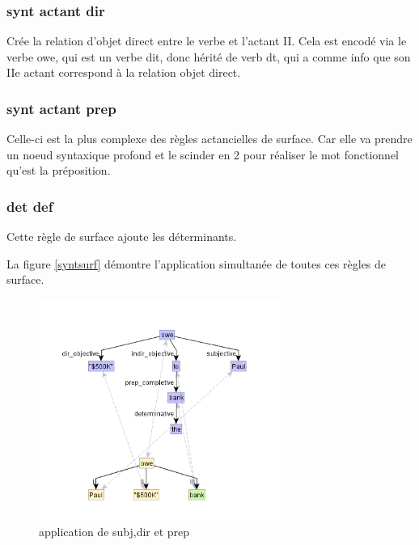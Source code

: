 
\subsubsection{synt actant dir}
Crée la relation d'objet direct entre le verbe et l'actant II. Cela est encodé via le verbe owe, qui est un verbe dit, donc hérité de verb dt, qui a comme info que son IIe actant correspond à la relation objet direct.

\subsubsection{synt actant prep}
Celle-ci est la plus complexe des règles actancielles de surface. Car elle va prendre un noeud syntaxique profond et le scinder en 2 pour réaliser le mot fonctionnel qu'est la préposition. 

\subsubsection{det def}
Cette règle de surface ajoute les déterminants.

La figure \ref{syntsurf} démontre l'application simultanée de toutes ces règles de surface.

\begin{figure}[htb]
	\centering
	\includegraphics[width=0.7\textwidth, trim = {0cm 0cm 0cm 0cm},clip]{ch3/figs/rsynts_syntactisation.png}
	\caption{application de subj,dir et prep}
	\label{fig:syntsurf}
\end{figure}


